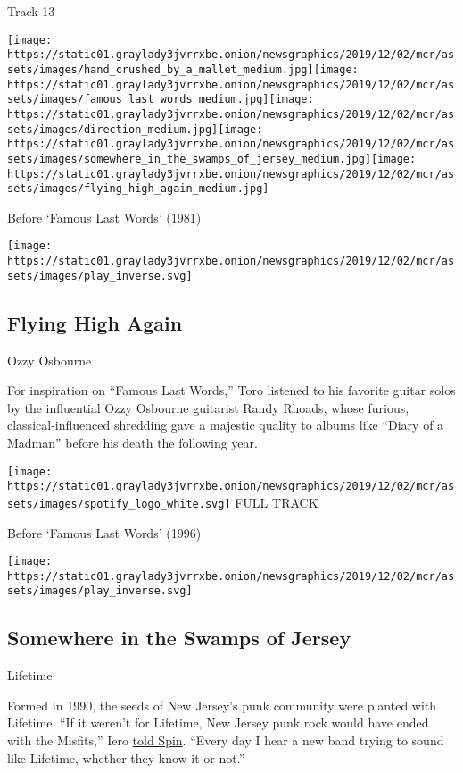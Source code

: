 Track 13

\texttt{[image: https://static01.graylady3jvrrxbe.onion/newsgraphics/2019/12/02/mcr/assets/images/hand\_crushed\_by\_a\_mallet\_medium.jpg]}\texttt{[image: https://static01.graylady3jvrrxbe.onion/newsgraphics/2019/12/02/mcr/assets/images/famous\_last\_words\_medium.jpg]}\texttt{[image: https://static01.graylady3jvrrxbe.onion/newsgraphics/2019/12/02/mcr/assets/images/direction\_medium.jpg]}\texttt{[image: https://static01.graylady3jvrrxbe.onion/newsgraphics/2019/12/02/mcr/assets/images/somewhere\_in\_the\_swamps\_of\_jersey\_medium.jpg]}\texttt{[image: https://static01.graylady3jvrrxbe.onion/newsgraphics/2019/12/02/mcr/assets/images/flying\_high\_again\_medium.jpg]}

Before `Famous Last Words' (1981)

\texttt{[image: https://static01.graylady3jvrrxbe.onion/newsgraphics/2019/12/02/mcr/assets/images/play\_inverse.svg]}

\hypertarget{flying-high-again}{%
\subsection{Flying High Again}\label{flying-high-again}}

Ozzy Osbourne

For inspiration on ``Famous Last Words,'' Toro listened to his favorite
guitar solos by the influential Ozzy Osbourne guitarist Randy Rhoads,
whose furious, classical-influenced shredding gave a majestic quality to
albums like ``Diary of a Madman'' before his death the following year.

\href{https://open.spotify.com/track/3VPcxdwwo9TcjAOYZa5ZrP?si=gMYGMCH9TgqIzipwEDw71g}{}

\texttt{[image: https://static01.graylady3jvrrxbe.onion/newsgraphics/2019/12/02/mcr/assets/images/spotify\_logo\_white.svg]}
FULL TRACK

Before `Famous Last Words' (1996)

\texttt{[image: https://static01.graylady3jvrrxbe.onion/newsgraphics/2019/12/02/mcr/assets/images/play\_inverse.svg]}

\hypertarget{somewhere-in-the-swamps-of-jersey}{%
\subsection{Somewhere in the Swamps of
Jersey}\label{somewhere-in-the-swamps-of-jersey}}

Lifetime

Formed in 1990, the seeds of New Jersey's punk community were planted
with Lifetime. ``If it weren't for Lifetime, New Jersey punk rock would
have ended with the Misfits,'' Iero
\href{https://web.archive.org/web/20070323030639/http://www.spin.com/features/exclusives/2006/03/060324_lifetime/}{told
Spin}. ``Every day I hear a new band trying to sound like Lifetime,
whether they know it or not.''

